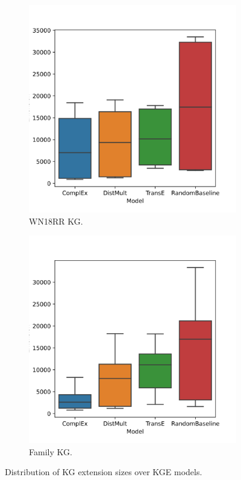 \begin{figure}[htb]
\centering
\begin{subfigure}{.5\textwidth}
  \centering
  \includegraphics[width=1\linewidth]{figures/appendix/Extension_sizes_models_WN18RR.svg}
  \caption{WN18RR KG.}
  \label{fig:rank_extension_wn18rr_boxplot_sub}
\end{subfigure}%
\begin{subfigure}{.5\textwidth}
  \centering
  \includegraphics[width=1\linewidth]{figures/appendix/Extension_sizes_models_family.svg}
  \caption{Family KG.}
  \label{fig:rank_extension_family_boxplot_sub}
\end{subfigure}
\caption{Distribution of KG extension sizes over KGE models.}
\label{rank_extensions_boxplot}
\end{figure}


